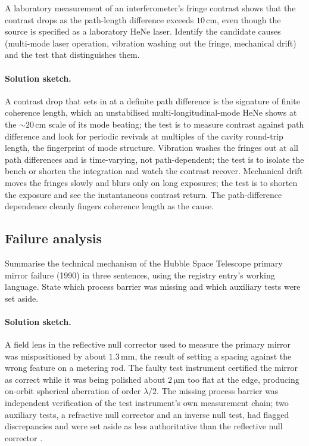 \begin{exercise}
A laboratory measurement of an interferometer's fringe contrast
shows that the contrast drops as the path-length difference exceeds
$10\,\si{\centi\meter}$, even though the source is specified as a
laboratory HeNe laser. Identify the candidate causes (multi-mode
laser operation, vibration washing out the fringe, mechanical drift)
and the test that distinguishes them.
\paragraph{Solution sketch.} A contrast drop that sets in at a definite
path difference is the signature of finite coherence length, which an
unstabilised multi-longitudinal-mode HeNe shows at the
$\sim 20\,\si{\centi\meter}$ scale of its mode beating; the test is to
measure contrast against path difference and look for periodic revivals
at multiples of the cavity round-trip length, the fingerprint of mode
structure. Vibration washes the fringes out at all path differences and
is time-varying, not path-dependent; the test is to isolate the bench or
shorten the integration and watch the contrast recover. Mechanical drift
moves the fringes slowly and blurs only on long exposures; the test is
to shorten the exposure and see the instantaneous contrast return. The
path-difference dependence cleanly fingers coherence length as the
cause.
\end{exercise}

\subsection*{Failure analysis}

\begin{exercise}
Summarise the technical mechanism of the Hubble Space Telescope
primary mirror failure (1990) in three sentences, using the registry
entry's working language. State which process barrier was missing
and which auxiliary tests were set aside.
\paragraph{Solution sketch.} A field lens in the reflective null
corrector used to measure the primary mirror was mispositioned by about
$1.3\,\si{\milli\meter}$, the result of setting a spacing against the
wrong feature on a metering rod. The faulty test instrument certified
the mirror as correct while it was being polished about
$2\,\si{\micro\meter}$ too flat at the edge, producing on-orbit
spherical aberration of order $\lambda/2$. The missing process barrier
was independent verification of the test instrument's own measurement
chain; two auxiliary tests, a refractive null corrector and an inverse
null test, had flagged discrepancies and were set aside as less
authoritative than the reflective null corrector
\cite{acc:nasa-hubble-optical-systems-1990}.
\end{exercise}

